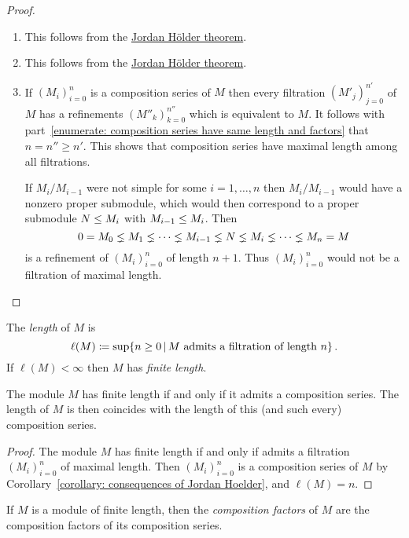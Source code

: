 \begin{proof}
  \leavevmode
  \begin{enumerate}
    \item
      This follows from the \hyperref[theorem: Jordan Hölder theorem]{Jordan Hölder theorem}.
    \item
      This follows from the \hyperref[theorem: Jordan Hölder theorem]{Jordan Hölder theorem}.
    \item
      If $(M_i)_{i=0}^n$ is a composition series of $M$ then every filtration $(M'_j)_{j=0}^{n'}$ of $M$ has a refinements $(M''_k)_{k=0}^{n''}$ which is equivalent to $M$.
      It follows with part~\ref*{enumerate: composition series have same length and factors} that $n = n'' \geq n'$.
      This shows that composition series have maximal length among all filtrations.
      
      If $M_i/M_{i-1}$ were not simple for some $i = 1, \dotsc, n$ then $M_i/M_{i-1}$ would have a nonzero proper submodule, which would then correspond to a proper submodule $N \leq M_i$ with $M_{i-1} \leq M_i$.
      Then
      \[
                    0
        =           M_0
        \lneq  M_1
        \lneq  \dotsb
        \lneq  M_{i-1}
        \lneq  N
        \lneq  M_i
        \lneq  \dotsb
        \lneq  M_n
        =           M
      \]
      is a refinement of $(M_i)_{i=0}^n$ of length $n+1$.
      Thus $(M_i)_{i=0}^n$ would not be a filtration of maximal length.
    \qedhere
  \end{enumerate}
\end{proof}


\begin{definition}
  The \emph{length} of $M$ is
  \[
              \ell(M)
    \defined  \sup  \{
                n \geq 0
              \suchthat
                \text{$M$ admits a filtration of length $n$}
              \} \,.
  \]
  If $\ell(M) < \infty$ then $M$ has \emph{finite length}.
\end{definition}


\begin{lemma}
  The module $M$ has finite length if and only if it admits a composition series.
  The length of $M$ is then coincides with the length of this (and such every) composition series.
\end{lemma}


\begin{proof}
  The module $M$ has finite length if and only if admits a filtration $(M_i)_{i=0}^n$ of maximal length.
  Then $(M_i)_{i=0}^n$ is a composition series of $M$ by Corollary~\ref{corollary: consequences of Jordan Hoelder}, and $\ell(M) = n$.
\end{proof}


\begin{definition}
  If $M$ is a module of finite length, then the \emph{composition factors} of $M$ are the composition factors of its composition series.
\end{definition}



